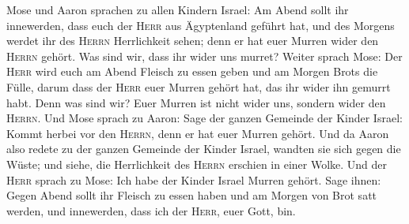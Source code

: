  Mose und Aaron sprachen zu allen Kindern Israel: Am Abend
sollt ihr innewerden, dass euch der \textsc{Herr} aus Ägyptenland
geführt hat,  und des Morgens werdet ihr des
\textsc{Herrn} Herrlichkeit sehen; denn er hat euer Murren wider den
\textsc{Herrn} gehört. Was sind wir, dass ihr wider uns murret?
 Weiter sprach Mose: Der \textsc{Herr} wird euch am Abend
Fleisch zu essen geben und am Morgen Brots die Fülle, darum dass der
\textsc{Herr} euer Murren gehört hat, das ihr wider ihn gemurrt habt.
Denn was sind wir? Euer Murren ist nicht wider uns, sondern wider den
\textsc{Herrn}.  Und Mose sprach zu Aaron: Sage der ganzen
Gemeinde der Kinder Israel: Kommt herbei vor den \textsc{Herrn}, denn er
hat euer Murren gehört.  Und da Aaron also redete zu der
ganzen Gemeinde der Kinder Israel, wandten sie sich gegen die Wüste; und
siehe, die Herrlichkeit des \textsc{Herrn} erschien in einer Wolke.
 Und der \textsc{Herr} sprach zu Mose: 
Ich habe der Kinder Israel Murren gehört. Sage ihnen: Gegen Abend sollt
ihr Fleisch zu essen haben und am Morgen von Brot satt werden, und
innewerden, dass ich der \textsc{Herr}, euer Gott, bin.

